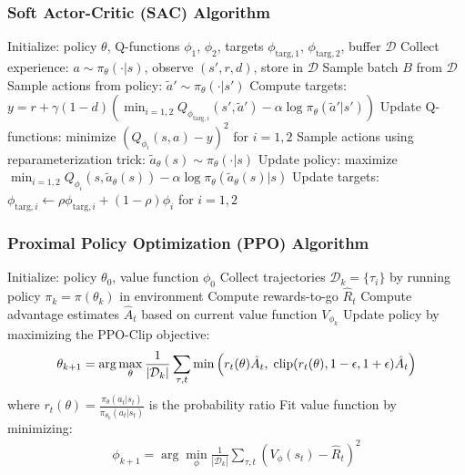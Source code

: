 \begin{frame}
    \frametitle{Soft Actor-Critic (SAC) Algorithm}
    \vspace{-0.25cm}
    \begin{algorithmic}[1]
    \STATE Initialize: policy $\theta$, Q-functions $\phi_1$, $\phi_2$, targets $\phi_{\text{targ},1}$, $\phi_{\text{targ},2}$, buffer $\mathcal{D}$
    \REPEAT
        \STATE Collect experience: $a \sim \pi_{\theta}(\cdot|s)$, observe $(s',r,d)$, store in $\mathcal{D}$
            \STATE Sample batch $B$ from $\mathcal{D}$
            \STATE Sample actions from policy: $\tilde{a}' \sim \pi_{\theta}(\cdot|s')$
            \STATE Compute targets: $y = r + \gamma (1-d) \left(\min_{i=1,2} Q_{\phi_{\text{targ}, i}} (s', \tilde{a}') - \alpha \log \pi_{\theta}(\tilde{a}'|s')\right)$
            \STATE Update Q-functions: minimize $(Q_{\phi_i}(s,a) - y)^2$ for $i=1,2$
            \STATE Sample actions using reparameterization trick: $\tilde{a}_{\theta}(s) \sim \pi_{\theta}(\cdot|s)$
            \STATE Update policy: maximize $\min_{i=1,2} Q_{\phi_i}(s, \tilde{a}_{\theta}(s)) - \alpha \log \pi_{\theta}(\tilde{a}_{\theta}(s)|s)$
            \STATE Update targets: $\phi_{\text{targ},i} \leftarrow \rho \phi_{\text{targ},i} + (1-\rho) \phi_i$ for $i=1,2$
        \ENDIF
    \end{algorithmic}
\end{frame}

\begin{frame}
    \frametitle{Proximal Policy Optimization (PPO) Algorithm}
    \vspace{-0.25cm}
    \begin{algorithmic}[1]
    \STATE Initialize: policy $\theta_0$, value function $\phi_0$
        \STATE Collect trajectories ${\mathcal D}_k = \{\tau_i\}$ by running policy $\pi_k = \pi(\theta_k)$ in environment
        \STATE Compute rewards-to-go $\hat{R}_t$
        \STATE Compute advantage estimates $\hat{A}_t$ based on current value function $V_{\phi_k}$
        \STATE Update policy by maximizing the PPO-Clip objective:
        \vspace{-1.5mm}
        \begin{align*}
            \vspace{-2mm}
            \theta_{k+1} = \arg \max_{\theta} \frac{1}{|{\mathcal D}_k|} \sum_{\tau, t} \min\left(
                r_t(\theta) \hat{A}_t, \; \text{clip}(r_t(\theta), 1-\epsilon, 1+\epsilon) \hat{A}_t
            \right)
        \vspace*{-2cm}
        \end{align*}
        \vspace{.5mm}
        where $r_t(\theta) = \frac{\pi_{\theta}(a_t|s_t)}{\pi_{\theta_k}(a_t|s_t)}$ is the probability ratio
        \STATE Fit value function by minimizing:
        \vspace{-2.5mm}
        \begin{align*}
            \phi_{k+1} = \arg \min_{\phi} \frac{1}{|{\mathcal D}_k|} \sum_{\tau, t}\left( V_{\phi}(s_t) - \hat{R}_t \right)^2
        \end{align*}
    \ENDFOR
    \end{algorithmic}
\end{frame}